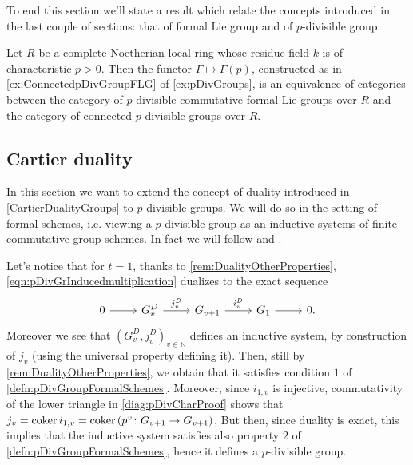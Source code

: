 \noindent
To end this section we'll state a result
which relate the concepts introduced in the last couple of sections:
that of formal Lie group and of $p$-divisible group.


\begin{prop}\label{prop:equivCatConnpDivGr}
	Let $R$ be a complete Noetherian local ring whose residue field $k$
	is of characteristic $p > 0$.
	Then the functor $\Gamma \mapsto \Gamma(p)$, constructed as in \cref{ex:ConnectedpDivGroupFLG}
	of \cref{ex:pDivGroups},
	is an equivalence of categories
	between the category of $p$-divisible commutative formal Lie groups over $R$
	and the category of connected $p$-divisible groups over $R$.
\end{prop}



\subsection{Cartier duality}%
In this section we want to extend the concept of duality introduced in \cref{CartierDualityGroups}
to $p$-divisible groups.
We will do so in the setting of formal schemes,
i.e. viewing a $p$-divisible group as an inductive systems of finite commutative group schemes.
In fact we will follow \cite[\S6]{Shatz} and \cite[\S2.3]{TatePC}.


\begin{rem}[]\label{rem:DualInductiveSystem}
	Let's notice that for $t = 1$, thanks to \cref{rem:DualityOtherProperties}, 
	\cref{eqn:pDivGrInducedmultiplication} dualizes to the exact sequence
	\begin{equation*}
	\begin{tikzcd}
		0 \arrow[r, "", rightarrow] &
		G_v^D \arrow[r, "j_v^D", rightarrow] &
		G_{v+1} \arrow[r, "i_v^D", rightarrow] &
		G_1 \arrow[r, "", rightarrow] &
		0
	.\end{tikzcd}
	\end{equation*}
	Moreover we see that $\left( G_v^D, j_v^D \right)_{v \in \mathbb{N}}$
	defines an inductive system, by construction of $j_v$ (using the universal property
	defining it).
	Then, still by \cref{rem:DualityOtherProperties}, we obtain that it satisfies condition
	$1$ of \cref{defn:pDivGroupFormalSchemes}.
	Moreover, since $i_{1,v}$ is injective,
	commutativity of the lower triangle in \cref{diag:pDivCharProof}
	shows that $j_v = \operatorname{coker} i_{1,v} = \operatorname{coker} \left( p^v\colon G_{v+1} \to G_{v+1} \right)$,
	But then, since duality is exact, this implies that the inductive system
	satisfies also property $2$ of \cref{defn:pDivGroupFormalSchemes},
	hence it defines a $p$-divisible group.
\end{rem}


